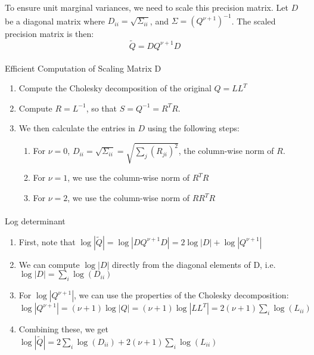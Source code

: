 \documentclass[journal=,manuscript=]{achemso}
\makeatletter
\let\oldparagraph\paragraph
\renewcommand{\paragraph}{
    \@ifstar
      \xxxParagraphStar
      \xxxParagraphNoStar
  }
\newcommand{\xxxParagraphStar}[1]{\oldparagraph*{#1}\mbox{}}
\newcommand{\xxxParagraphNoStar}[1]{\oldparagraph{#1}\mbox{}}
\providecommand{\tightlist}{%
  \setlength{\itemsep}{0pt}\setlength{\parskip}{0pt}}\usepackage{longtable,booktabs,array}
\makeatother
\begin{document}
To ensure unit marginal variances, we need to scale this precision
matrix. Let \(D\) be a diagonal matrix where
\(D_{ii} = \sqrt{\Sigma_{ii}}\), and \(\Sigma = (Q^{\nu+1})^{-1}\). The
scaled precision matrix is then: \[
\tilde{Q} = DQ^{\nu+1}D
\]

\paragraph{Efficient Computation of Scaling Matrix
D}\label{efficient-computation-of-scaling-matrix-d}

\begin{enumerate}
\def\labelenumi{\arabic{enumi}.}
\tightlist
\item
  Compute the Cholesky decomposition of the original \(Q = LL^T\)
\item
  Compute \(R = L^{-1}\), so that \(S = Q^{-1} = R^TR\).
\item
  We then calculate the entries in \(D\) using the following steps:

  \begin{enumerate}
  \def\labelenumii{\roman{enumii}.}
  \tightlist
  \item
    For \(\nu = 0\),
    \(D_{ii} = \sqrt{\Sigma_{ii}} = \sqrt{\sum_j (R_{ji})^2}\), the
    column-wise norm of \(R\).
  \item
    For \(\nu = 1\), we use the column-wise norm of \(R^TR\)
  \item
    For \(\nu = 2\), we use the column-wise norm of \(RR^TR\)
  \end{enumerate}
\end{enumerate}

\paragraph{Log determinant}\label{log-determinant}

\begin{enumerate}
\def\labelenumi{\arabic{enumi}.}
\tightlist
\item
  First, note that
  \(\log|\tilde{Q}| = \log|DQ^{\nu+1}D| = 2\log|D| + \log|Q^{\nu+1}|\)
\item
  We can compute \(\log|D|\) directly from the diagonal elements of D,
  i.e.~\(\log|D| = \sum_i \log(D_{ii})\)
\item
  For \(\log|Q^{\nu+1}|\), we can use the properties of the Cholesky
  decomposition:
  \(\log|Q^{\nu+1}| = (\nu+1)\log|Q| = (\nu+1)\log|LL^T| = 2(\nu+1)\sum_i \log(L_{ii})\)
\item
  Combining these, we get
  \(\log|\tilde{Q}| = 2\sum_i \log(D_{ii}) + 2(\nu+1)\sum_i \log(L_{ii})\)
\end{enumerate}
\end{document}
